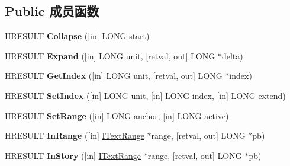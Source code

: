 \subsection*{Public 成员函数}
\begin{DoxyCompactItemize}
\item 
\mbox{\label{interfacetom_1_1_i_text_range_affcbe2b71644e0843d561f016ab5312c}} 
H\+R\+E\+S\+U\+LT {\bfseries Collapse} (\mbox{[}in\mbox{]} L\+O\+NG start)
\item 
\mbox{\label{interfacetom_1_1_i_text_range_a1a04f5bad17e6603d921abe3dc1a6306}} 
H\+R\+E\+S\+U\+LT {\bfseries Expand} (\mbox{[}in\mbox{]} L\+O\+NG unit, \mbox{[}retval, out\mbox{]} L\+O\+NG $\ast$delta)
\item 
\mbox{\label{interfacetom_1_1_i_text_range_aadb856147eae920b5c8d51d4c5ec1faf}} 
H\+R\+E\+S\+U\+LT {\bfseries Get\+Index} (\mbox{[}in\mbox{]} L\+O\+NG unit, \mbox{[}retval, out\mbox{]} L\+O\+NG $\ast$index)
\item 
\mbox{\label{interfacetom_1_1_i_text_range_af56c95096f994e4044828a0224bf1c20}} 
H\+R\+E\+S\+U\+LT {\bfseries Set\+Index} (\mbox{[}in\mbox{]} L\+O\+NG unit, \mbox{[}in\mbox{]} L\+O\+NG index, \mbox{[}in\mbox{]} L\+O\+NG extend)
\item 
\mbox{\label{interfacetom_1_1_i_text_range_a8e5ef85d1750554df9006c64c46006f5}} 
H\+R\+E\+S\+U\+LT {\bfseries Set\+Range} (\mbox{[}in\mbox{]} L\+O\+NG anchor, \mbox{[}in\mbox{]} L\+O\+NG active)
\item 
\mbox{\label{interfacetom_1_1_i_text_range_a7e8a10b68254a81ae2e565e4048ae543}} 
H\+R\+E\+S\+U\+LT {\bfseries In\+Range} (\mbox{[}in\mbox{]} \hyperlink{interfacetom_1_1_i_text_range}{I\+Text\+Range} $\ast$range, \mbox{[}retval, out\mbox{]} L\+O\+NG $\ast$pb)
\item 
\mbox{\label{interfacetom_1_1_i_text_range_af40869d0cb67c6cd3a37d3e6b76cea0f}} 
H\+R\+E\+S\+U\+LT {\bfseries In\+Story} (\mbox{[}in\mbox{]} \hyperlink{interfacetom_1_1_i_text_range}{I\+Text\+Range} $\ast$range, \mbox{[}retval, out\mbox{]} L\+O\+NG $\ast$pb)

\end{DoxyCompactItemize}
